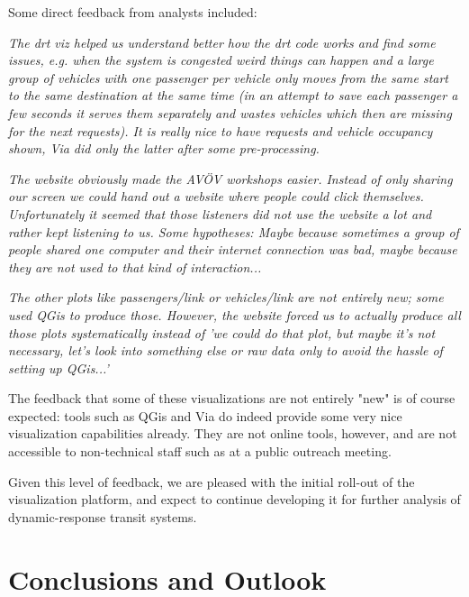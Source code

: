 \documentclass[3p,times,procedia]{elsarticle}
\begin{document}
Some direct feedback from analysts included:

\begin{displayquote}\emph{
  The drt viz helped us understand better how the drt code works and find some issues, e.g. when the system is congested weird things can happen and a large group of vehicles with one passenger per vehicle only moves from the same start to the same destination at the same time (in an attempt to save each passenger a few seconds it serves them separately and wastes vehicles which then are missing for the next requests). It is really nice to have requests and vehicle occupancy shown, Via did only the latter after some pre-processing.
}\end{displayquote}

\begin{displayquote}\emph{
  The website obviously made the AVÖV workshops easier. Instead of only sharing our screen we could hand out a website where people could click themselves. Unfortunately it seemed that those listeners did not use the website a lot and rather kept listening to us. Some hypotheses: Maybe because sometimes a group of people shared one computer and their internet connection was bad, maybe because they are not used to that kind of interaction...
}\end{displayquote}

\begin{displayquote}\emph{
  The other plots like passengers/link or vehicles/link are not entirely new; some used QGis to produce those. However, the website forced us to actually produce all those plots systematically instead of 'we could do that plot, but maybe it's not necessary, let's look into something else or raw data only to avoid the hassle of setting up QGis...'
}\end{displayquote}

The feedback that some of these visualizations are not entirely "new" is of course expected: tools such as QGis and Via do indeed provide some very nice visualization capabilities already. They are not online tools, however, and are not accessible to non-technical staff such as at a public outreach meeting.

Given this level of feedback, we are pleased with the initial roll-out of the visualization platform, and expect to continue developing it for further analysis of dynamic-response transit systems.

\section{Conclusions and Outlook}
\label{conclusions}
\end{document}
